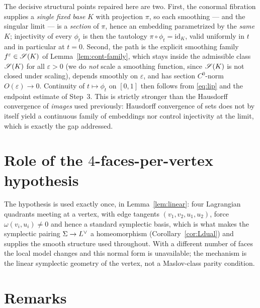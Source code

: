 \begin{qeightremark}
The decisive structural points repaired here are two. First, the conormal
fibration supplies a \emph{single fixed base} $K$ with projection $\pi$, so each
smoothing — and the singular limit — is a \emph{section} of $\pi$, hence an
embedding parametrized by the \emph{same} $K$; injectivity of every $\phi_t$ is
then the tautology $\pi\circ\phi_t=\mathrm{id}_K$, valid uniformly in $t$ and in
particular at $t=0$. Second, the path is the explicit smoothing family
$f^\varepsilon\in\mathscr S(K)$ of Lemma~\ref{lem:cont-family}, which stays inside the
admissible class $\mathscr S(K)$ for all $\varepsilon>0$ (we do \emph{not} scale a
smoothing function, since $\mathscr S(K)$ is not closed under scaling), depends smoothly
on $\varepsilon$, and has section $C^0$-norm $O(\varepsilon)\to0$. Continuity of
$t\mapsto\phi_t$ on $[0,1]$ then follows from \eqref{eq:lip} and the endpoint
estimate of Step~3. This is strictly stronger than the Hausdorff convergence of
\emph{images} used previously: Hausdorff convergence of sets does not by itself
yield a continuous family of embeddings nor control injectivity at the limit,
which is exactly the gap addressed.
\end{qeightremark}


\section*{Role of the $4$-faces-per-vertex hypothesis}

The hypothesis is used exactly once, in Lemma~\ref{lem:linear}: four Lagrangian
quadrants meeting at a vertex, with edge tangents $(v_1,v_2,u_1,u_2)$, force
$\omega(v_i,u_i)\ne0$ and hence a standard symplectic basis, which is what makes
the symplectic pairing $\Sigma\to L^{\vee}$ a homeomorphism
(Corollary~\ref{cor:Ldual}) and supplies the smooth structure used throughout.
With a different number of faces the local model changes and this normal form is
unavailable; the mechanism is the linear symplectic geometry of the vertex, not a
Maslov-class parity condition.

\section*{Remarks}

